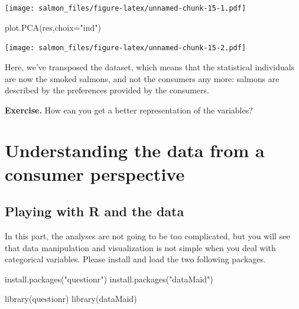 \documentclass[
]{book}
\newenvironment{Shaded}{\begin{snugshade}}{\end{snugshade}}
\newcommand{\AttributeTok}[1]{\textcolor[rgb]{0.77,0.63,0.00}{#1}}
\newcommand{\FunctionTok}[1]{\textcolor[rgb]{0.00,0.00,0.00}{#1}}
\newcommand{\NormalTok}[1]{#1}
\newcommand{\StringTok}[1]{\textcolor[rgb]{0.31,0.60,0.02}{#1}}
\begin{document}
\texttt{[image: salmon\_files/figure-latex/unnamed-chunk-15-1.pdf]}

\begin{Shaded}
\begin{Highlighting}[]
\FunctionTok{plot.PCA}\NormalTok{(res,}\AttributeTok{choix=}\StringTok{"ind"}\NormalTok{)}
\end{Highlighting}
\end{Shaded}

\texttt{[image: salmon\_files/figure-latex/unnamed-chunk-15-2.pdf]}

Here, we've transposed the dataset, which means that the statistical individuals are now the smoked salmons, and not the consumers any more: salmons are described by the preferences provided by the consumers.

\textbf{Exercise. }How can you get a better representation of the variables?

\hypertarget{understanding-the-data-from-a-consumer-perspective}{%
\chapter{Understanding the data from a consumer perspective}\label{understanding-the-data-from-a-consumer-perspective}}

\hypertarget{playing-with-r-and-the-data}{%
\section{Playing with R and the data}\label{playing-with-r-and-the-data}}

In this part, the analyses are not going to be too complicated, but you will see that data manipulation and visualization is not simple when you deal with categorical variables.
Please install and load the two following packages.

\begin{Shaded}
\begin{Highlighting}[]
\FunctionTok{install.packages}\NormalTok{(}\StringTok{"questionr"}\NormalTok{)}
\FunctionTok{install.packages}\NormalTok{(}\StringTok{"dataMaid"}\NormalTok{)}
\end{Highlighting}
\end{Shaded}

\begin{Shaded}
\begin{Highlighting}[]
\FunctionTok{library}\NormalTok{(questionr)}
\FunctionTok{library}\NormalTok{(dataMaid)}
\end{Highlighting}
\end{Shaded}
\end{document}

